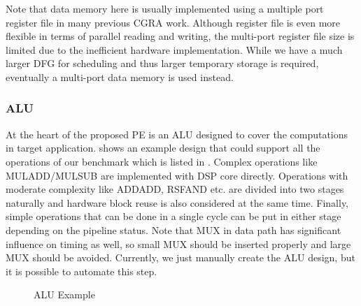 Note that data memory here is usually implemented using a multiple port register file in many previous CGRA work. Although register file is even more flexible in terms of parallel reading and writing, the multi-port register file size is limited due to the inefficient hardware implementation. While we have a much larger DFG for scheduling and thus larger temporary storage is required, eventually a multi-port data memory is used instead. 

\subsubsection{ALU}
At the heart of the proposed PE is an ALU designed to cover the computations in target application.  shows an example design that could support all the operations of our benchmark which is listed in . Complex operations like MULADD/MULSUB are implemented with DSP core directly. Operations with moderate complexity like ADDADD, RSFAND etc. are divided into two stages naturally and hardware block reuse is also considered at the same time. Finally, simple operations that can be done in a single cycle can be put in either stage depending on the pipeline status. Note that MUX in data path has significant influence on timing as well, so small MUX should be inserted properly and large MUX should be avoided. Currently, we just manually create the ALU design, but it is possible to automate this step. 

\begin{figure}[h]
\caption{ALU Example}
\label{fig:ALU}
\end{figure} 

